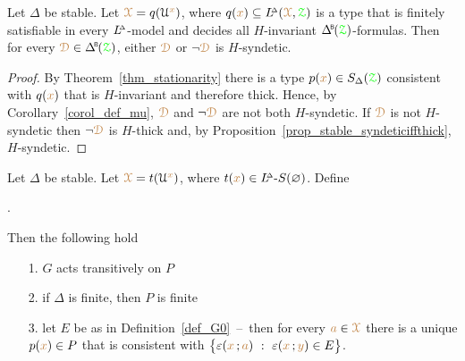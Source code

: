 \begin{corollary}\label{corol_stable_syndetic}
  Let $\Delta$ be stable.
  Let ${\color{brown}\EuScript X}=q(\EuScript U^{\color{brown} x})$, where $q({\color{brown} x})\subseteq L\kern-.5ex^{\scriptscriptstyle\Delta}({\color{brown}\EuScript X},{\color{green}\EuScript Z})$ is a type that is finitely satisfiable in every $L\kern-.5ex^{\scriptscriptstyle\Delta}$-model and decides all $H$-invariant $\BDelta(\grZ)$-formulas.
  Then for every $\mrD\in\BDelta(\grZ)$, either ${\color{brown}\EuScript D}$ or $\neg{\color{brown}\EuScript D}$ is $H$-syndetic.
\end{corollary}

\begin{proof}
  By Theorem~\ref{thm_stationarity} there is a type $p({\color{brown} x})\in S_\Delta({\color{green}\EuScript Z})$ consistent with $q({\color{brown} x})$ that is $H$-invariant and therefore thick.
  Hence, by Corollary~\ref{corol_def_mu}, ${\color{brown}\EuScript D}$ and $\neg{\color{brown}\EuScript D}$ are not both $H$-syndetic.
  If ${\color{brown}\EuScript D}$ is not $H$-syndetic then $\neg{\color{brown}\EuScript D}$ is $H$-thick and, by Proposition~\ref{prop_stable_syndeticiffthick}, $H$-syndetic.
\end{proof}

\begin{theorem}\label{thm_FER}
  Let $\Delta$ be stable.
  Let ${\color{brown}\EuScript X}=t(\EuScript U^{\color{brown} x})$, where $t({\color{brown} x})\in L\kern-.5ex^{\scriptscriptstyle\Delta}\mbox{-}S(\varnothing)$.
  Define \smallskip
  
  . \smallskip
  
  Then the following hold
  \begin{itemize}
    \item [1.] $G$ acts transitively on $P$
    \item [2.] if $\Delta$ is finite, then $P$ is finite
    
    \item [3.] let $E$ be as in Definition~\ref{def_G0}~--~then for every ${\color{brown} a}\in{\color{brown}\EuScript X}$ there is a unique $p({\color{brown} x})\in P$ that is consistent with $\big\{\epsilon({\mr x}\,;{\mr a})\ :\ \epsilon({\mr x}\,;{\mr y})\in E\big\}$.
  \end{itemize}
\end{theorem}

